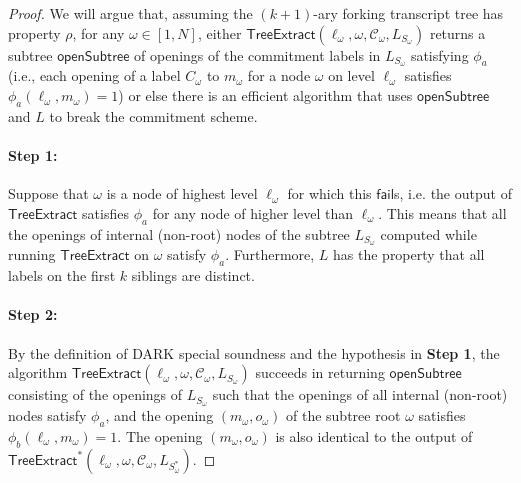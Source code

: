 \begin{proof}
We will argue that, assuming the $(k+1)$-ary forking transcript tree has property $\rho$, for any $\omega \in [1,N]$, either $\textsf{TreeExtract}(\ell_\omega, \omega, \mathcal{C}_\omega, L_{S_\omega})$ returns a subtree $\textsf{openSubtree}$ of openings of the commitment labels in $L_{S_\omega}$ satisfying $\phi_a$ (i.e., each opening of a label $C_\omega$ to $m_\omega$ for a node $\omega$ on level $\ell_\omega$ satisfies $\phi_a(\ell_\omega, m_\omega) = 1$) or else there is an efficient algorithm that uses $\textsf{openSubtree}$ and $L$ to break the commitment scheme. 


\paragraph{Step 1:} Suppose that $\omega$ is a node of highest level $\ell_{\omega}$ for which this $\mathsf{fail}$s, i.e. the output of $\textsf{TreeExtract}$ satisfies $\phi_a$ for any node of higher level than $\ell_\omega$. 
This means that all the openings of internal (non-root) nodes of the subtree $L_{S_\omega}$ computed while running $\textsf{TreeExtract}$ on $\omega$ satisfy $\phi_a$. Furthermore, $L$ has the property that all labels on the first $k$ siblings are distinct. 

\paragraph{Step 2:} By the definition of DARK special soundness and the hypothesis in \textbf{Step 1}, the algorithm $\textsf{TreeExtract}(\ell_\omega, \omega, \mathcal{C}_\omega, L_{S_\omega})$ succeeds in returning $\textsf{openSubtree}$ consisting of the openings of $L_{S_\omega}$ such that the openings of all internal (non-root) nodes satisfy $\phi_a$, and the opening $(m_\omega, o_\omega)$ of the subtree root $\omega$ satisfies $\phi_b(\ell_\omega, m_\omega) = 1$. The opening $(m_\omega, o_\omega)$ is also identical to the output of $\textsf{TreeExtract}^*(\ell_\omega, \omega, \mathcal{C}_\omega, L_{S^*_\omega})$. 


\end{proof}
